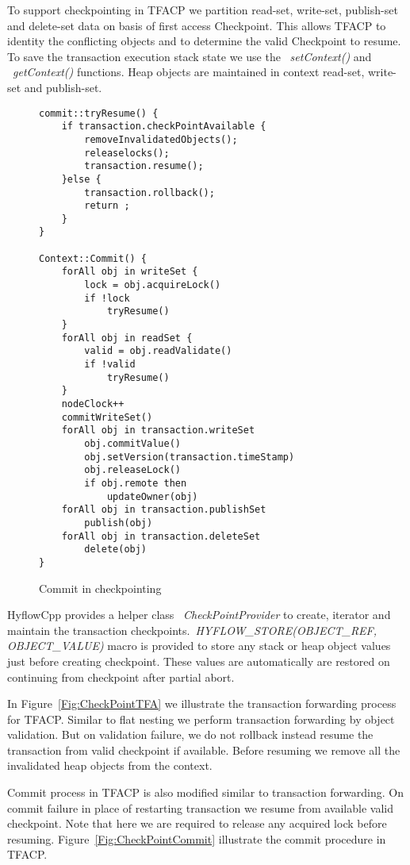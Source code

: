 \documentclass[12pt,english]{report}
\begin{document}
To support checkpointing in TFACP we partition read-set, write-set, publish-set and delete-set data on basis of first access Checkpoint. This allows TFACP to identity the conflicting objects and to determine the valid Checkpoint to resume. To save the transaction execution stack state we use the ~\emph{setContext()} and ~\emph{getContext()} functions. Heap objects are maintained in context read-set, write-set and publish-set. 

\begin{figure}
\begin{minipage}[b]{0.9\linewidth}\centering
\begin{lstlisting}
commit::tryResume() {
	if transaction.checkPointAvailable {
		removeInvalidatedObjects();
		releaselocks();
		transaction.resume();
	}else {
		transaction.rollback();
		return ;
	}		
}

Context::Commit() {
	forAll obj in writeSet {
		lock = obj.acquireLock()
		if !lock
			tryResume()
	}
	forAll obj in readSet {
		valid = obj.readValidate()
		if !valid
			tryResume()
	}
	nodeClock++
	commitWriteSet()
	forAll obj in transaction.writeSet
		obj.commitValue()
 		obj.setVersion(transaction.timeStamp)
 		obj.releaseLock()
 		if obj.remote then
 			updateOwner(obj)
	forAll obj in transaction.publishSet
		publish(obj)
	forAll obj in transaction.deleteSet
		delete(obj)
}
\end{lstlisting}
\end{minipage}
\caption{Commit in checkpointing}
\label{Fig:CheckpointCommit}
\end{figure}

HyflowCpp provides a helper class ~\emph{CheckPointProvider} to create, iterator and maintain the transaction checkpoints.~\emph{HYFLOW{\_}STORE(OBJECT{\_}REF, OBJECT{\_}VALUE)} macro is provided to store any stack or heap object values just before creating checkpoint. These values are automatically are restored on continuing from checkpoint after partial abort.     

In Figure~\ref{Fig:CheckPointTFA} we illustrate the transaction forwarding process for TFACP. Similar to flat nesting we perform transaction forwarding by object validation. But on validation failure, we do not rollback instead resume the transaction from valid checkpoint if available. Before resuming we remove all the invalidated heap objects from the context.

Commit process in TFACP is also modified similar to transaction forwarding. On commit failure in place of restarting transaction we resume from available valid checkpoint. Note that here we are required to release any acquired lock before resuming. Figure~\ref{Fig:CheckPointCommit} illustrate the commit procedure in TFACP. 
\end{document}
